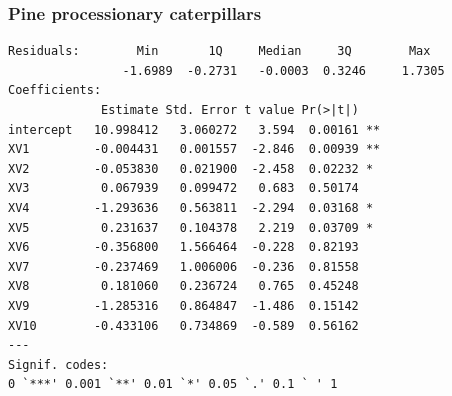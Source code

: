 \begin{frame}[fragile]
\frametitle{Pine processionary caterpillars}

\footnotesize
\begin{verbatim}
Residuals:        Min       1Q     Median     3Q        Max
                -1.6989  -0.2731   -0.0003  0.3246     1.7305
Coefficients:
             Estimate Std. Error t value Pr(>|t|)
intercept   10.998412   3.060272   3.594  0.00161 **
XV1         -0.004431   0.001557  -2.846  0.00939 **
XV2         -0.053830   0.021900  -2.458  0.02232 * 
XV3          0.067939   0.099472   0.683  0.50174
XV4         -1.293636   0.563811  -2.294  0.03168 *
XV5          0.231637   0.104378   2.219  0.03709 *
XV6         -0.356800   1.566464  -0.228  0.82193
XV7         -0.237469   1.006006  -0.236  0.81558
XV8          0.181060   0.236724   0.765  0.45248
XV9         -1.285316   0.864847  -1.486  0.15142
XV10        -0.433106   0.734869  -0.589  0.56162
---
Signif. codes:  
0 `***' 0.001 `**' 0.01 `*' 0.05 `.' 0.1 ` ' 1
\end{verbatim}
\normalsize

\end{frame}
